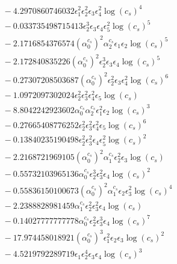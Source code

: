\documentclass[10pt]{article}
\begin{document}
\begin{align*}
&{}  - 4.2970860746032 \epsilon_{1}^{2} \epsilon_{2}^{2} \epsilon_{3} \epsilon_{4}^{2} \log{\left(c_{s} \right)}^{4} \\
&{}  - 0.033735498715413 \epsilon_{2}^{3} \epsilon_{3} \epsilon_{4} \epsilon_{5}^{2} \log{\left(c_{s} \right)}^{5} \\
&{}  - 2.1716854376574 \left(\alpha_{0}^{c_s}\right)^{2} \alpha_{2}^{c_s} \epsilon_{1} \epsilon_{2} \log{\left(c_{s} \right)}^{5} \\
&{}  - 2.172840835226 \left(\alpha_{0}^{c_s}\right)^{2} \epsilon_{2}^{3} \epsilon_{3} \epsilon_{4} \log{\left(c_{s} \right)}^{5} \\
&{}  - 0.27307208503687 \left(\alpha_{0}^{c_s}\right)^{2} \epsilon_{2}^{2} \epsilon_{3} \epsilon_{4}^{2} \log{\left(c_{s} \right)}^{6} \\
&{}  - 1.0972097302024 \epsilon_{2}^{2} \epsilon_{3}^{2} \epsilon_{4}^{2} \epsilon_{5} \log{\left(c_{s} \right)} \\
&{}  - 8.8042242923602 \alpha_{0}^{c_s} \alpha_{2}^{c_s} \epsilon_{1}^{2} \epsilon_{2} \log{\left(c_{s} \right)}^{3} \\
&{}  - 0.27665408776252 \epsilon_{2}^{2} \epsilon_{3}^{2} \epsilon_{4}^{2} \epsilon_{5} \log{\left(c_{s} \right)}^{6} \\
&{}  - 0.13840235190498 \epsilon_{2}^{2} \epsilon_{3}^{2} \epsilon_{4} \epsilon_{5}^{2} \log{\left(c_{s} \right)}^{2} \\
&{}  - 2.2168721969105 \left(\alpha_{0}^{c_s}\right)^{2} \alpha_{1}^{c_s} \epsilon_{2}^{2} \epsilon_{3} \log{\left(c_{s} \right)} \\
&{}  - 0.55732103965136 \alpha_{0}^{c_s} \epsilon_{2}^{3} \epsilon_{3}^{2} \epsilon_{4} \log{\left(c_{s} \right)}^{2} \\
&{}  - 0.55836150100673 \left(\alpha_{0}^{c_s}\right)^{2} \alpha_{1}^{c_s} \epsilon_{2} \epsilon_{3}^{2} \log{\left(c_{s} \right)}^{4} \\
&{}  - 2.2388828981459 \alpha_{1}^{c_s} \epsilon_{2}^{2} \epsilon_{3}^{2} \epsilon_{4} \log{\left(c_{s} \right)} \\
&{}  - 0.14027777777778 \alpha_{0}^{c_s} \epsilon_{2}^{2} \epsilon_{3}^{3} \epsilon_{4} \log{\left(c_{s} \right)}^{7} \\
&{}  - 17.974458018921 \left(\alpha_{0}^{c_s}\right)^{3} \epsilon_{1}^{2} \epsilon_{2} \epsilon_{3} \log{\left(c_{s} \right)}^{2} \\
&{}  - 4.5219792289719 \epsilon_{1} \epsilon_{2}^{4} \epsilon_{3} \epsilon_{4} \log{\left(c_{s} \right)}^{3} \\

\end{align*}
\end{document}
